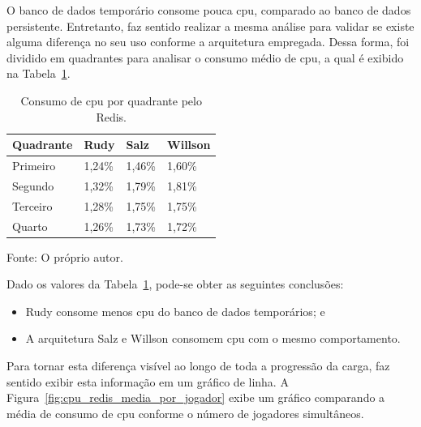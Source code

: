 O banco de dados temporário consome pouca \ac{cpu}, comparado ao banco de dados persistente.
%
Entretanto, faz sentido realizar a mesma análise para validar se existe alguma diferença no seu uso conforme a arquitetura empregada.
%
Dessa forma, foi dividido em quadrantes para analisar o consumo médio de \ac{cpu}, a qual é exibido na Tabela~\ref{tab:cpu_redis_media_quadrantes}.

\begin{table}[htb!]
\centering
\begin{adjustbox}{max width=\textwidth}
\caption{Consumo de \ac{cpu} por quadrante pelo Redis.}
\label{tab:cpu_redis_media_quadrantes}
\begin{tabular}{|l|l|l|l|}

\hline

Quadrante & Rudy    & Salz    & Willson \\ \hline

Primeiro  & 1,24\% & 1,46\% & 1,60\% \\ \hline

Segundo   & 1,32\% & 1,79\% & 1,81\% \\ \hline

Terceiro  & 1,28\% & 1,75\% & 1,75\% \\ \hline

Quarto    & 1,26\% & 1,73\% & 1,72\% \\ \hline

\end{tabular}

\end{adjustbox}

Fonte: O próprio autor.
\end{table}

Dado os valores da Tabela~\ref{tab:cpu_redis_media_quadrantes}, pode-se obter as seguintes conclusões:

\begin{itemize}
 \item Rudy consome menos \ac{cpu} do banco de dados temporários; e
 \item A arquitetura Salz e Willson consomem \ac{cpu} com o mesmo comportamento.
\end{itemize}

Para tornar esta diferença visível ao longo de toda a progressão da carga, faz sentido exibir esta informação em um gráfico de linha.
%
A Figura~\ref{fig:cpu_redis_media_por_jogador} exibe um gráfico comparando a média de consumo de \ac{cpu} conforme o número de jogadores simultâneos.

